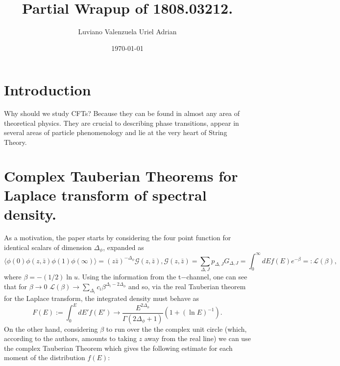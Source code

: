 \documentclass[letterpaper]{article}
\date{\today}
\begin{document}
\title{
  Partial Wrapup of 1808.03212.
  }
\author{
  Luviano Valenzuela Uriel Adrian
}

\newcommand{\inty}{\int_{-\infty}^{\infty}} 
\newcommand{\Lag}{\mathcal{L}} 
\newcommand{\Id}{\mathbb{I}} 
\newcommand{\Tr}{\mathrm{Tr}} 
\newcommand{\tr}{\mathrm{tr}} 
\newcommand{\Det}{\mathrm{Det}} 
\newcommand{\gauge}{\mathcal{A}} 
\newcommand{\Lac}{\ensuremath{\mathbf{\hat{L}^2}}} 
\newcommand{\La}{\ensuremath{\mathbf{\hat{L}}}} 
\newcommand{\Ham}{\ensuremath{\hat{H}}} 
\renewcommand{\a}{\ensuremath{(e_1)}}
\renewcommand{\b}{\ensuremath{(e_2)}}
\renewcommand{\c}{\ensuremath{(e_3)}}
\newcommand\cd{\mathrel{\stackrel{\makebox[0pt]{\mbox{\normalfont\tiny
CD}}}{\longleftrightarrow}}}
\newcommand{\tmop}[1]{\ensuremath{\operatorname{#1}}}
\newcommand{\then}{\ensuremath{\Rightarrow}}
\newcommand{\res}{\ensuremath{\mathrm{Res}}}
\newcommand{\R}{\ensuremath{\mathbb{R}}}
\newcommand{\integral}[1]{\ensuremath{\int_{a}^{b} #1 dt}}
\maketitle

\section{Introduction}
Why should we study CFTs? Because they can be found in almost any area of
theoretical physics. They are crucial to describing phase transitions, appear in
several areas of particle phenomenology and lie at the very heart of String
Theory.



\section{Complex Tauberian Theorems for Laplace transform of spectral density.}

As a motivation, the paper starts by considering the four point function for
identical scalars of dimension $\Delta_\phi$, expanded as
\[
  \langle \phi(0) \phi(z,\bar z) \phi(1) \phi(\infty)\rangle
  =
  (z\bar z)^{-\Delta_\phi} \mathcal{G}(z,\bar z),
\mathcal{G}(z,\bar z)
  =
  \sum_{\Delta,J} p_{\Delta ,J} G_{\Delta, J}
  =
  \int_0^\infty dE f(E) e^{-\beta} =: \mathcal{L}(\beta),
\]
where $\beta = -(1/2)\ln u $. Using the information from the t$-$channel, one can see that for $\beta \to 0$ 
$\mathcal{L}(\beta) \to \sum_{\Delta_i} c_i \beta^{\Delta_i-2\Delta_\phi}$ and so, via the real Tauberian
theorem for the Laplace transform, the integrated density must behave as
\[
  F(E) := \int_0^E dE' f(E')\to
  \frac{E^{2\Delta_\phi}}{\Gamma(2\Delta_\phi +1)}
  (1+ (\ln E) ^{-1}).
\]
On the other hand, considering $\beta$ to run over the the complex unit circle
(which, according to the authors, amounts to taking $z$ away from the real line)
we can use the complex Tauberian Theorem which gives the following estimate for
each moment of the distribution $f(E)$:
\end{document}
